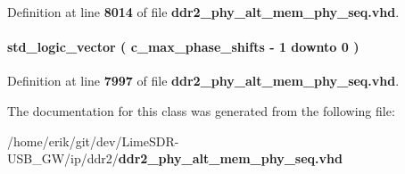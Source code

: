 Definition at line {\bf 8014} of file {\bf ddr2\+\_\+phy\+\_\+alt\+\_\+mem\+\_\+phy\+\_\+seq.\+vhd}.

\paragraph[{working\+\_\+window}]{ {\bfseries \textcolor{comment}{std\+\_\+logic\+\_\+vector}\textcolor{vhdlchar}{ }\textcolor{vhdlchar}{(}\textcolor{vhdlchar}{ }\textcolor{vhdlchar}{ }\textcolor{vhdlchar}{ }\textcolor{vhdlchar}{ }{\bfseries {\bf c\+\_\+max\+\_\+phase\+\_\+shifts}} \textcolor{vhdlchar}{-\/}\textcolor{vhdlchar}{ } \textcolor{vhdldigit}{1} \textcolor{vhdlchar}{ }\textcolor{keywordflow}{downto}\textcolor{vhdlchar}{ }\textcolor{vhdlchar}{ } \textcolor{vhdldigit}{0} \textcolor{vhdlchar}{ }\textcolor{vhdlchar}{)}\textcolor{vhdlchar}{ }} \hspace{0.3cm}{\ttfamily [Record]}}\label{classddr2__phy__alt__mem__phy__dgrb_1_1struct_a7345141913475d79ace2fad65a025331}


Definition at line {\bf 7997} of file {\bf ddr2\+\_\+phy\+\_\+alt\+\_\+mem\+\_\+phy\+\_\+seq.\+vhd}.



The documentation for this class was generated from the following file\+:\begin{DoxyCompactItemize}
\item 
/home/erik/git/dev/\+Lime\+S\+D\+R-\/\+U\+S\+B\+\_\+\+G\+W/ip/ddr2/{\bf ddr2\+\_\+phy\+\_\+alt\+\_\+mem\+\_\+phy\+\_\+seq.\+vhd}\end{DoxyCompactItemize}
